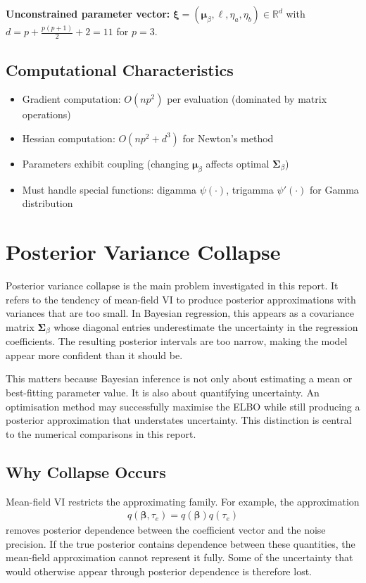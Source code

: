 \documentclass[11pt,a4paper]{article}
\newcommand{\R}{\mathbb{R}}
\begin{document}
\textbf{Unconstrained parameter vector:} $\bm{\xi} = (\bm{\mu}_\beta, \bm{\ell}, \eta_a, \eta_b) \in \R^d$ with $d = p + \frac{p(p+1)}{2} + 2 = 11$ for $p=3$.

\subsection*{Computational Characteristics}

\begin{itemize}
\item Gradient computation: $O(np^2)$ per evaluation (dominated by matrix operations)
\item Hessian computation: $O(np^2 + d^3)$ for Newton's method
\item Parameters exhibit coupling (changing $\bm{\mu}_\beta$ affects optimal $\bm{\Sigma}_\beta$)
\item Must handle special functions: digamma $\psi(\cdot)$, trigamma $\psi'(\cdot)$ for Gamma distribution
\end{itemize}

\section{Posterior Variance Collapse}
\label{sec:posterior-variance-collapse}

Posterior variance collapse is the main problem investigated in this report. It refers to the tendency of mean-field VI to produce posterior approximations with variances that are too small. In Bayesian regression, this appears as a covariance matrix $\bm{\Sigma}_\beta$ whose diagonal entries underestimate the uncertainty in the regression coefficients. The resulting posterior intervals are too narrow, making the model appear more confident than it should be.

This matters because Bayesian inference is not only about estimating a mean or best-fitting parameter value. It is also about quantifying uncertainty. An optimisation method may successfully maximise the ELBO while still producing a posterior approximation that understates uncertainty. This distinction is central to the numerical comparisons in this report.

\subsection{Why Collapse Occurs}

Mean-field VI restricts the approximating family. For example, the approximation
\begin{align}
q(\bm{\beta},\tau_e) = q(\bm{\beta})q(\tau_e)
\end{align}
removes posterior dependence between the coefficient vector and the noise precision. If the true posterior contains dependence between these quantities, the mean-field approximation cannot represent it fully. Some of the uncertainty that would otherwise appear through posterior dependence is therefore lost.
\end{document}
